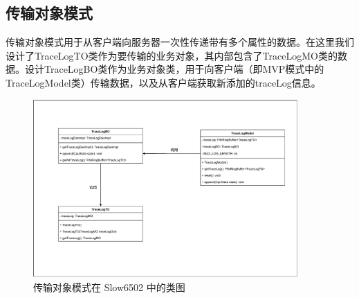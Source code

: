 \subsection{传输对象模式}

传输对象模式用于从客户端向服务器一次性传递带有多个属性的数据。在这里我们设计了TraceLogTO类作为要传输的业务对象，其内部包含了TraceLogMO类的数据。设计TraceLogBO类作为业务对象类，用于向客户端（即MVP模式中的TraceLogModel类）传输数据，以及从客户端获取新添加的traceLog信息。

\begin{figure}[htb]
  \centering
  \includegraphics[width=0.9\textwidth]{figures/传输对象模式.pdf}
  \caption{传输对象模式在 Slow6502 中的类图}
\end{figure}
